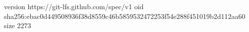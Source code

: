 version https://git-lfs.github.com/spec/v1
oid sha256:ebac0d449508936f38d8559c46b5859532472253f54e288f451019b2d112aa60
size 2273
